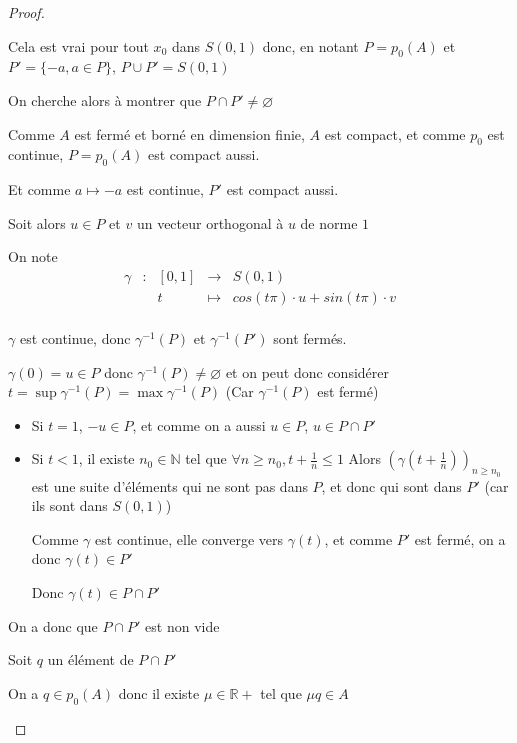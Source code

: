 \documentclass[a4paper]{article}
\begin{document}
\begin{proof}
\begin{itemize}
    Cela est vrai pour tout $x_{0}$ dans $S(0, 1)$ donc, en notant $P = p_{0}(A)$ et $P' = \{-a, a \in P \}$, $P \cup P' = S(0, 1)$

    \bigskip

    On cherche alors à montrer que $ P \cap P' \neq \varnothing$

    Comme $A$ est fermé et borné en dimension finie, $A$ est compact, et comme $p_{0}$ est continue, $P = p_{0}(A)$ est compact aussi.

    Et comme $a \mapsto -a$ est continue, $P'$ est compact aussi.

    Soit alors $u \in P$ et $v$ un vecteur orthogonal à $u$ de norme $1$

    On note 
    \[\begin{array}{ccccl}
    \gamma & : & [0, 1] & \to     & S(0, 1) \\
           &   & t      & \mapsto & cos(t\pi) \cdot u + sin(t\pi) \cdot v \\
    \end{array}\]

    $\gamma$ est continue, donc $\gamma^{-1}(P)$ et $\gamma^{-1}(P')$ sont fermés.

    $\gamma(0) = u \in P$ donc $\gamma^{-1}(P) \neq \varnothing$ et on peut donc considérer $t = \sup \gamma^{-1}(P) = \max \gamma^{-1}(P)$ (Car $\gamma^{-1}(P)$ est fermé)

    \begin{itemize}
    \item Si $t = 1$, $-u \in P$, et comme on a aussi $u \in P$, $u \in P \cap P'$
    \medskip
    \item Si $t < 1$, il existe $n_{0} \in \mathbb{N}$ tel que $\forall n \geqslant n_{0}, t + \frac{1}{n} \leqslant 1$
    Alors $(\gamma(t + \frac{1}{n}))_{n \geqslant n_{0}}$ est une suite d'éléments qui ne sont pas dans $P$, et donc qui sont dans $P'$ (car ils sont dans $S(0, 1)$)


    Comme $\gamma$ est continue, elle converge vers $\gamma(t)$, et comme $P'$ est fermé, on a donc $\gamma(t) \in P'$

    Donc $\gamma(t) \in P \cap P'$
    \end{itemize}

    On a donc que $P \cap P'$ est non vide

    \bigskip

    Soit $q$ un élément de $P \cap P'$

    On a $q \in p_{0}(A)$ donc il existe $\mu \in \mathbb{R}+$ tel que $\mu q \in A$


\end{itemize}
\end{proof}
\end{document}
